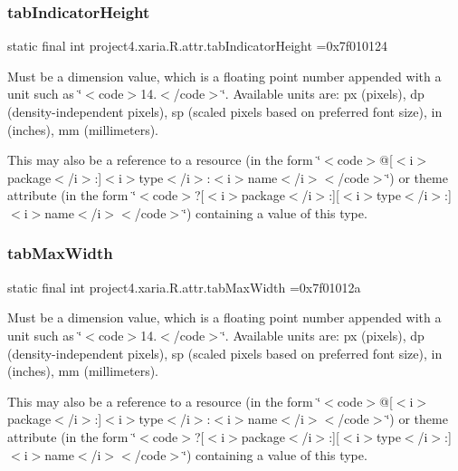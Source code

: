 \subsubsection{\texorpdfstring{tab\+Indicator\+Height}{tabIndicatorHeight}}
{\footnotesize\ttfamily static final int project4.\+xaria.\+R.\+attr.\+tab\+Indicator\+Height =0x7f010124\hspace{0.3cm}{\ttfamily [static]}}

Must be a dimension value, which is a floating point number appended with a unit such as \char`\"{}$<$code$>$14.\+5sp$<$/code$>$\char`\"{}. Available units are\+: px (pixels), dp (density-\/independent pixels), sp (scaled pixels based on preferred font size), in (inches), mm (millimeters). 

This may also be a reference to a resource (in the form \char`\"{}$<$code$>$@\mbox{[}$<$i$>$package$<$/i$>$\+:\mbox{]}$<$i$>$type$<$/i$>$\+:$<$i$>$name$<$/i$>$$<$/code$>$\char`\"{}) or theme attribute (in the form \char`\"{}$<$code$>$?\mbox{[}$<$i$>$package$<$/i$>$\+:\mbox{]}\mbox{[}$<$i$>$type$<$/i$>$\+:\mbox{]}$<$i$>$name$<$/i$>$$<$/code$>$\char`\"{}) containing a value of this type. \mbox{\label{classproject4_1_1xaria_1_1R_1_1attr_a8c5d5a0c2872de047ef5c6bf2e6510a3}} 
\subsubsection{\texorpdfstring{tab\+Max\+Width}{tabMaxWidth}}
{\footnotesize\ttfamily static final int project4.\+xaria.\+R.\+attr.\+tab\+Max\+Width =0x7f01012a\hspace{0.3cm}{\ttfamily [static]}}

Must be a dimension value, which is a floating point number appended with a unit such as \char`\"{}$<$code$>$14.\+5sp$<$/code$>$\char`\"{}. Available units are\+: px (pixels), dp (density-\/independent pixels), sp (scaled pixels based on preferred font size), in (inches), mm (millimeters). 

This may also be a reference to a resource (in the form \char`\"{}$<$code$>$@\mbox{[}$<$i$>$package$<$/i$>$\+:\mbox{]}$<$i$>$type$<$/i$>$\+:$<$i$>$name$<$/i$>$$<$/code$>$\char`\"{}) or theme attribute (in the form \char`\"{}$<$code$>$?\mbox{[}$<$i$>$package$<$/i$>$\+:\mbox{]}\mbox{[}$<$i$>$type$<$/i$>$\+:\mbox{]}$<$i$>$name$<$/i$>$$<$/code$>$\char`\"{}) containing a value of this type. \mbox{\label{classproject4_1_1xaria_1_1R_1_1attr_af771b1a2a31740f100954848d28a0542}} 
